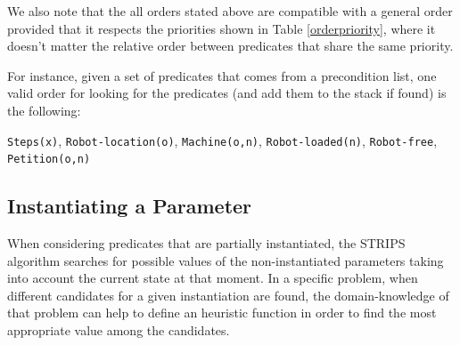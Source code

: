 \documentclass[12pt,a4paper,oneside]{article}
\numberwithin{equation}{section}
\numberwithin{equation}{section}
\theoremstyle{definition}
\begin{document}
We also note that the all orders stated above are compatible with a general order provided that it respects the priorities shown in Table \ref{orderpriority}, where it doesn’t matter the relative order between predicates that share the same priority. 

\begin{table}[]
\centering
{}
\caption{Preferences that must satisfy a general order.}
\label{orderpriority}
\end{table}

For instance, given a set of predicates that comes from a precondition list, one valid order for looking for the predicates (and add them to the stack if found) is the following:

\texttt{Steps(x)}, \texttt{Robot-location(o)}, \texttt{Machine(o,n)}, \texttt{Robot-loaded(n)}, \texttt{Robot-free}, \texttt{Petition(o,n)}


\subsection{Instantiating a Parameter} \label{Instantiating a Parameter}

When considering predicates that are partially instantiated, the STRIPS algorithm searches for possible values of the non-instantiated parameters taking into account the current state at that moment. In a specific problem, when different candidates for a given instantiation are found, the domain-knowledge of that problem can help to define an heuristic function in order to find the most appropriate value among the candidates.
\end{document}
